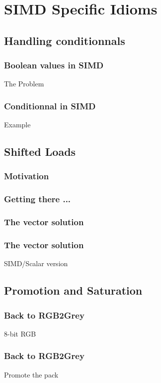 \section{SIMD Specific Idioms}
\subsection{Handling conditionnals}
\frame 
{
  \frametitle{Boolean values in SIMD}
  \begin{block}{The Problem}
  \lstsimdbool
 \end{block}{}

}

\frame 
{
  \frametitle{Conditionnal in SIMD}
  \begin{block}{Example}
 \end{block}{}
}

\subsection{Shifted Loads}
\frame 
{
  \frametitle{Motivation}
   \begin{center}\end{center}
}

\frame 
{
  \frametitle{Getting there ...}
   \begin{center}\end{center}
}

\frame 
{
  \frametitle{The vector solution}
   \begin{center}\end{center}
}

\frame 
{
  \frametitle{The vector solution}
   \begin{block}{SIMD/Scalar version}
   \lstfilter
   \end{block}
}

\subsection{Promotion and Saturation}
\frame
{
	\frametitle{Back to RGB2Grey}
   	\begin{block}{8-bit RGB}
	\lstbitsrgb
	\end{block}{}
}

\frame
{
	\frametitle{Back to RGB2Grey}
   	\begin{block}{Promote the pack}
	\lstpromotergb
	\end{block}{}
}
